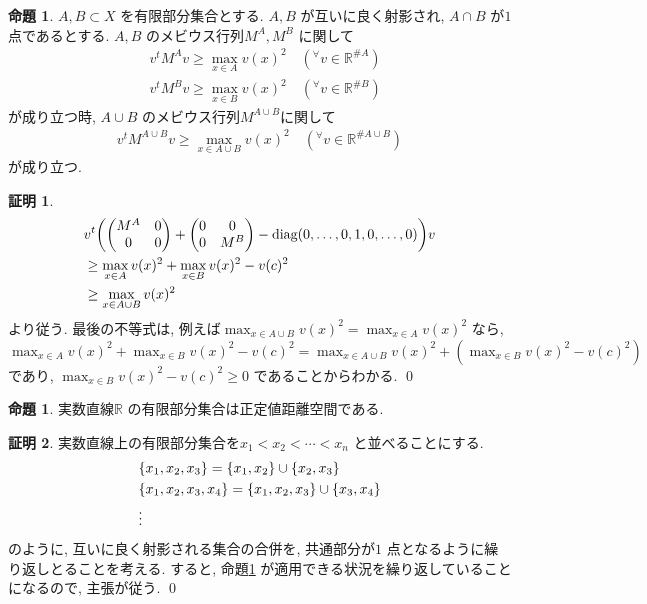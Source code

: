 \documentclass[10pt, fleqn, label-section=none]{bxjsarticle}
\theoremstyle{definition}
\newtheorem{prop}[dfn]{命題}
\newtheorem*{pf*}{証明}
\newcommand{\any}{{}^{\forall}}
\newcommand{\paren}[1]{\mleft( #1\mright )}
\newcommand{\cbra}[1]{\mleft\{#1\mright\}}
\newcommand{\diag}{\textrm{diag}}
\renewcommand{\;}{\, ; \,}
\newcommand{\gyouretsu}[1]{\begin{pmatrix} #1 \end{pmatrix} }
\begin{document}
\begin{prop}\label{2149} $A, B \subset X$ を有限部分集合とする. $A, B$ が互いに良く射影され, $A \cap B$ が$1$点であるとする. $A, B$ のメビウス行列$M^A, M^B$ に関して
\begin{align*} & v^t M^A v \geq \max_{x \in A }{v(x)^2 } \quad (\any v \in \mathbb R^{\# A}) \\ & v^t M^B v \geq \max_{x \in B }{v(x)^2 } \quad (\any v \in \mathbb R^{\# B}) \end{align*}
が成り立つ時, $A \cup B$ のメビウス行列$M^{A \cup B}$に関して
\begin{align*}  v^t M^{A \cup B} v \geq \max_{x \in A \cup B }{v(x)^2 } \quad (\any v \in \mathbb R^{\# A \cup B})  \end{align*}
が成り立つ. 
\end{prop}
\begin{pf*}
\begin{align*} & v^t \paren{ \gyouretsu{ M^A & 0 \\ 0 & 0   } + \gyouretsu{ 0 & 0 \\ 0 & M^B   } - \diag(0, \ldots ,0,  1 , 0, \ldots , 0) } v \\& \geq \max_{x \in A}  v(x) ^2  + \max_{x \in B} v(x) ^2  - v(c)^2  \\& \geq \max_{x \in A \cup B}  v(x) ^2  \end{align*}
より従う. 最後の不等式は, 例えば$\max_{x \in A \cup B}  v(x) ^2  = \max_{x \in A}  v(x) ^2 $ なら, $\max_{x \in A}  v(x) ^2  + \max_{x \in B} v(x) ^2  - v(c)^2  =\max_{x \in A \cup B}  v(x) ^2 +  (\max_{x \in B} v(x) ^2  - v(c)^2) $ であり, $\max_{x \in B} v(x) ^2  - v(c)^2 \geq 0 $ であることからわかる. 
\qed
\end{pf*}



\begin{prop}実数直線$\mathbb R$ の有限部分集合は正定値距離空間である. 
\end{prop}
\begin{pf*}
実数直線上の有限部分集合を$x_1 < x_2 < \cdots < x_n$ と並べることにする. 
\begin{align*} &\cbra{x_1, x_2, x_3} =  \cbra{x_1, x_2} \cup \cbra{x_2, x_3} \\
&\cbra{x_1, x_2, x_3, x_4} =  \cbra{x_1, x_2, x_3} \cup \cbra{x_3, x_4} \\ 
& \vdots 
\end{align*}
のように, 互いに良く射影される集合の合併を, 共通部分が$1$ 点となるように繰り返しとることを考える. すると, 命題\ref {2149} が適用できる状況を繰り返していることになるので, 主張が従う. 
\qed
\end{pf*}
\end{document}
